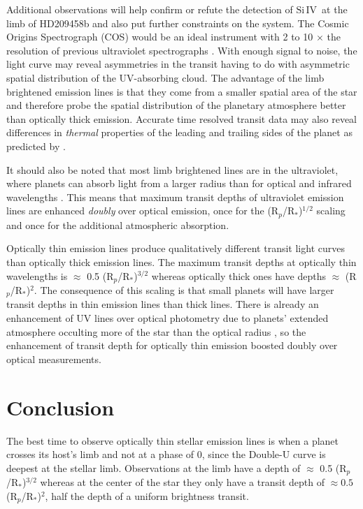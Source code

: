 \documentclass[manuscript]{aastex}
\newcommand{\siIV}{\ensuremath{\mathrm{Si}\,\scriptstyle \mathrm{IV}}}
\newcommand{\p}{R$_p$/R$_*$}
\begin{document}
Additional observations will help confirm or refute the detection of \siIV\ at the limb of HD209458b and also put further constraints on the system. The Cosmic Origins Spectrograph (COS) would be an ideal instrument with 2 to 10 $\times$ the resolution of previous ultraviolet spectrographs \citep{cos}. With enough signal to noise, the light curve may reveal asymmetries in the transit having to do with asymmetric spatial distribution of the UV-absorbing cloud. The advantage of the limb brightened emission lines is that they come from a smaller spatial area of the star and therefore probe the spatial distribution of the planetary atmosphere better than optically thick emission. Accurate time resolved transit data may also reveal differences in {\it thermal} properties of the leading and trailing sides of the planet as predicted by \citet{fortney}.

It should also be noted that most limb brightened lines are in the ultraviolet, where planets can absorb light from a larger radius than for optical and infrared wavelengths \citep{vidmad}. This means that maximum transit depths of ultraviolet emission lines are enhanced {\it doubly} over optical emission, once for the (\p )$^{1/2}$ scaling and once for the additional atmospheric absorption.

Optically thin emission lines produce qualitatively different transit light curves than optically thick emission lines. The maximum transit depths at optically thin wavelengths is $\approx$ 0.5 (\p )$^{3/2}$ whereas optically thick ones have depths $\approx$ (\p )$^2$. The consequence of this scaling is that small planets will have larger transit depths in thin emission lines than thick lines. There is already an enhancement of UV lines over optical photometry due  to planets' extended atmosphere occulting more of the star than the optical radius \citep{kosk}, so the enhancement of transit depth for optically thin emission boosted doubly over optical measurements.

\section{Conclusion}

The best time to observe optically thin stellar emission lines is when a planet crosses its host's limb and not at a phase of 0, since the Double-U curve is deepest at the stellar limb. Observations at the limb have a depth of $\approx$ 0.5 (\p )$^{3/2}$ whereas at the center of the star they only have a transit depth of  $\approx 0.5 $(\p)$^2$, half the depth of a uniform brightness transit.
\end{document}
